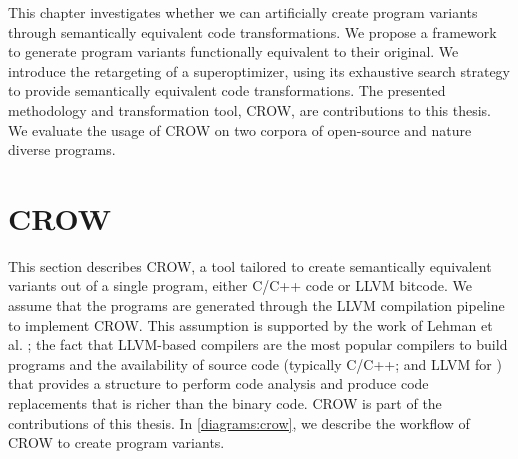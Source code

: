 

\label{chapter:generation}

\newcommand{\libsodiumfunctions}{687}
\newcommand{\qrcodefunctions}{1840}

\newcommand{\diversifiedsodium}{89}
\newcommand{\diversifiedqrcode}{130}
\newcommand{\libpopulation}{2408}
\newcommand{\qrpopulation}{4155}

\newcommand{\py}[1]{}

\newcommand{\allmewefunctions}{\libsodiumfunctions + \qrcodefunctions}
\newcommand{\allmewediversified}{\diversifiedsodium + \diversifiedqrcode}
\newcommand{\allmewepopulation}{\libpopulation + \qrpopulation}



This chapter investigates whether we can artificially create program variants through semantically equivalent code transformations. We propose a framework to generate program variants functionally equivalent to their original.
We introduce the retargeting of a superoptimizer, using its exhaustive search strategy to provide semantically equivalent code transformations. 
The presented methodology and transformation tool, CROW, are contributions to this thesis.
We evaluate the usage of CROW on two corpora of open-source and nature diverse programs. 



\section{CROW}
\label{section:crow}
This section describes CROW, a tool tailored to create semantically equivalent variants out of a single program, either C/C++ code or LLVM bitcode. We assume that the \wasm programs are generated through the LLVM compilation pipeline to implement CROW. This assumption is supported by the work of Lehman et al. \cite{}; the fact that LLVM-based compilers are the most popular compilers to build \wasm programs \cite{usenixWASM2020} and the availability of source code (typically C/C++; and LLVM for \wasm) that provides a structure to perform code analysis and produce code replacements that is richer than the binary code. CROW is part of the contributions of this thesis.
In \autoref{diagrams:crow}, we describe the workflow of CROW to create program variants.

